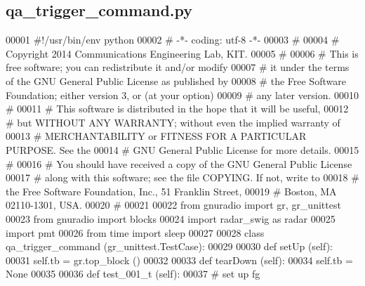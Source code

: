 \subsection{qa\+\_\+trigger\+\_\+command.\+py}
\label{qa__trigger__command_8py_source}

\begin{DoxyCode}
00001 \textcolor{comment}{#!/usr/bin/env python}
00002 \textcolor{comment}{# -*- coding: utf-8 -*-}
00003 \textcolor{comment}{# }
00004 \textcolor{comment}{# Copyright 2014 Communications Engineering Lab, KIT.}
00005 \textcolor{comment}{# }
00006 \textcolor{comment}{# This is free software; you can redistribute it and/or modify}
00007 \textcolor{comment}{# it under the terms of the GNU General Public License as published by}
00008 \textcolor{comment}{# the Free Software Foundation; either version 3, or (at your option)}
00009 \textcolor{comment}{# any later version.}
00010 \textcolor{comment}{# }
00011 \textcolor{comment}{# This software is distributed in the hope that it will be useful,}
00012 \textcolor{comment}{# but WITHOUT ANY WARRANTY; without even the implied warranty of}
00013 \textcolor{comment}{# MERCHANTABILITY or FITNESS FOR A PARTICULAR PURPOSE.  See the}
00014 \textcolor{comment}{# GNU General Public License for more details.}
00015 \textcolor{comment}{# }
00016 \textcolor{comment}{# You should have received a copy of the GNU General Public License}
00017 \textcolor{comment}{# along with this software; see the file COPYING.  If not, write to}
00018 \textcolor{comment}{# the Free Software Foundation, Inc., 51 Franklin Street,}
00019 \textcolor{comment}{# Boston, MA 02110-1301, USA.}
00020 \textcolor{comment}{# }
00021 
00022 \textcolor{keyword}{from} gnuradio \textcolor{keyword}{import} gr, gr\_unittest
00023 \textcolor{keyword}{from} gnuradio \textcolor{keyword}{import} blocks
00024 \textcolor{keyword}{import} radar\_swig \textcolor{keyword}{as} radar
00025 \textcolor{keyword}{import} pmt
00026 \textcolor{keyword}{from} time \textcolor{keyword}{import} sleep
00027 
00028 \textcolor{keyword}{class }qa_trigger_command (gr\_unittest.TestCase):
00029 
00030     \textcolor{keyword}{def }setUp (self):
00031         self.tb = gr.top\_block ()
00032 
00033     \textcolor{keyword}{def }tearDown (self):
00034         self.tb = \textcolor{keywordtype}{None}
00035 
00036     \textcolor{keyword}{def }test_001_t (self):
00037         \textcolor{comment}{# set up fg}

\end{DoxyCode}
